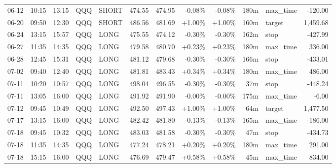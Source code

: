 \documentclass[11pt,a4paper,twoside]{article}
\begin{document}
\begin{center}
\begin{longtable}{>{\color{txtmain}}l l l l l r r r r r >{\color{txtmain}}l r}
06-12 & 10:15 & 13:15 & QQQ & SHORT & 474.55 & 474.95 & \textcolor{lossred}{-0.08\%} & \textcolor{lossred}{-0.08\%} & 180m & max\_time & \textcolor{lossred}{-120.00} \\
06-20 & 09:50 & 12:30 & QQQ & SHORT & 486.56 & 481.69 & \textcolor{wingreen}{+1.00\%} & \textcolor{wingreen}{+1.00\%} & 160m & target & \textcolor{wingreen}{1,459.68} \\
06-24 & 13:15 & 15:57 & QQQ & LONG & 475.55 & 474.12 & \textcolor{lossred}{-0.30\%} & \textcolor{lossred}{-0.30\%} & 162m & stop & \textcolor{lossred}{-427.99} \\
06-27 & 11:35 & 14:35 & QQQ & LONG & 479.58 & 480.70 & \textcolor{wingreen}{+0.23\%} & \textcolor{wingreen}{+0.23\%} & 180m & max\_time & \textcolor{wingreen}{336.00} \\
06-28 & 12:45 & 15:31 & QQQ & LONG & 481.12 & 479.68 & \textcolor{lossred}{-0.30\%} & \textcolor{lossred}{-0.30\%} & 166m & stop & \textcolor{lossred}{-433.01} \\
07-02 & 09:40 & 12:40 & QQQ & LONG & 481.81 & 483.43 & \textcolor{wingreen}{+0.34\%} & \textcolor{wingreen}{+0.34\%} & 180m & max\_time & \textcolor{wingreen}{486.00} \\
07-11 & 10:20 & 10:57 & QQQ & LONG & 498.04 & 496.55 & \textcolor{lossred}{-0.30\%} & \textcolor{lossred}{-0.30\%} & 37m & stop & \textcolor{lossred}{-448.24} \\
07-11 & 13:05 & 16:00 & QQQ & LONG & 491.92 & 491.90 & \textcolor{lossred}{-0.00\%} & \textcolor{lossred}{-0.00\%} & 175m & max\_time & \textcolor{lossred}{-6.00} \\
07-12 & 09:45 & 10:49 & QQQ & LONG & 492.50 & 497.43 & \textcolor{wingreen}{+1.00\%} & \textcolor{wingreen}{+1.00\%} & 64m & target & \textcolor{wingreen}{1,477.50} \\
07-17 & 13:15 & 16:00 & QQQ & LONG & 482.42 & 481.80 & \textcolor{lossred}{-0.13\%} & \textcolor{lossred}{-0.13\%} & 165m & max\_time & \textcolor{lossred}{-186.00} \\
07-18 & 09:45 & 10:32 & QQQ & LONG & 483.03 & 481.58 & \textcolor{lossred}{-0.30\%} & \textcolor{lossred}{-0.30\%} & 47m & stop & \textcolor{lossred}{-434.73} \\
07-18 & 11:35 & 14:35 & QQQ & LONG & 477.24 & 478.21 & \textcolor{wingreen}{+0.20\%} & \textcolor{wingreen}{+0.20\%} & 180m & max\_time & \textcolor{wingreen}{291.00} \\
07-18 & 15:15 & 16:00 & QQQ & LONG & 476.69 & 479.47 & \textcolor{wingreen}{+0.58\%} & \textcolor{wingreen}{+0.58\%} & 45m & max\_time & \textcolor{wingreen}{834.00} \\

\end{longtable}
\end{center}
\end{document}

